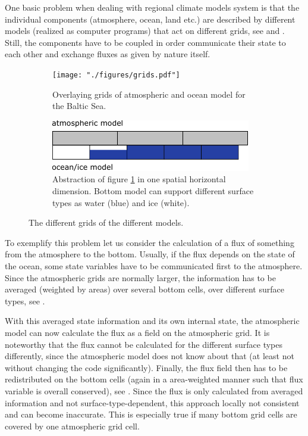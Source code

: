 \documentclass[a4paper,titlepage]{scrartcl}
\begin{document}
One basic problem when dealing with regional climate models system is that the individual components (atmosphere, ocean, land etc.) are described by different models (realized as computer programs) that act on different grids, see  and .
%
Still, the components have to be coupled in order communicate their state to each other and exchange fluxes as given by nature itself.

\begin{figure}[H]
	\centering
    \begin{subfigure}[t]{0.48\textwidth}
        \centering
		\texttt{[image: "./figures/grids.pdf"]} 
		\caption{
		\label{fig:grids2D}
		Overlaying grids of atmospheric and ocean model for the Baltic Sea.
		}
		\end{subfigure}
    \hfill
    \vspace{1em}
    \begin{subfigure}[t]{0.48\textwidth}
        \centering
		\includegraphics[width=\linewidth]{"./figures/grids1D.pdf"}
		\caption{
		\label{fig:grids1D}
		Abstraction of figure \ref{fig:grids2D} in one spatial horizontal dimension. Bottom model can support different surface types as water (blue) and ice (white).
		}
	\end{subfigure}
	\caption{The different grids of the different models.}
\end{figure}

To exemplify this problem let us consider the calculation of a flux of something from the atmosphere to the bottom.
%
Usually, if the flux depends on the state of the ocean, some state variables have to be communicated first to the atmosphere.
%
Since the atmospheric grids are normally larger, the information has to be averaged (weighted by areas) over several bottom cells, 
over different surface types, see .

With this averaged state information and its own internal state, the atmospheric model can now calculate the flux as a field on the atmospheric grid.
%
It is noteworthy that the flux cannot be calculated for the different surface types differently, since the atmospheric model does not know about that (at least not without changing the code significantly).
%
Finally, the flux field then has to be redistributed on the bottom cells (again in a area-weighted manner such that flux variable is overall conserved), 
see .
%
Since the flux is only calculated from averaged information and not surface-type-dependent, this approach locally not consistent and can become inaccurate. 
%
This is especially true if many bottom grid cells are covered by one atmospheric grid cell.
\end{document}
